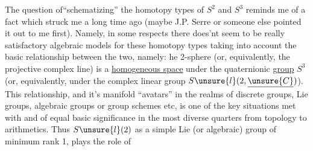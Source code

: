The question of``schematizing'' the homotopy types of $S^2$ and $S^3$ reminds
me of a fact which struck me a long time ago (maybe J.P. Serre or someone
else pointed it out to me first).  Namely,  in some respects there does'nt
seem to be  really satisfactory algebraic models for these homotopy types\hand{,}
taking into account the basic relationship between the two,  namely:
he 2-sphere (or,  equivalently,  the projective complex line)  is a
\uline{homogeneous space} under the quaternionic \uline{group} $S^3$ (or,  equivalently,
under the complex linear group $S\unsure{l}(2,\underline{\unsure{C}})$).  This  relationship,  and
it's manifold ``avatars'' in the realms of discrete groups, Lie groups,
algebraic  groups or group schemes etc,  is one of the  key situations
met with\hand{,} and of equal basic significance\hand{,} in the most diverse quarters
from topology to arithmetics.   Thus $S\unsure{l}(2)$  as a
simple Lie (or algebraic) group of minimum rank 1,  plays the  role of

